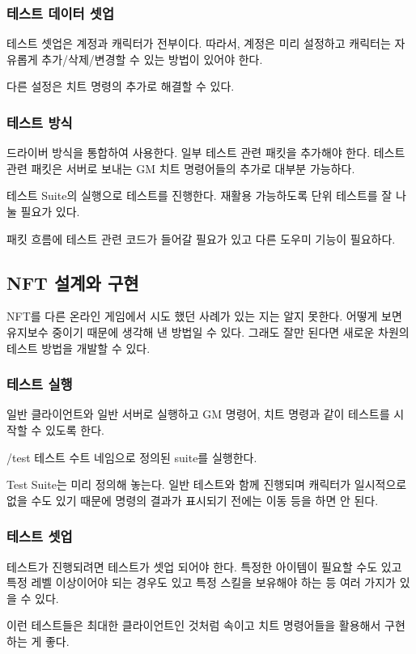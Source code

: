 \documentclass[chapter,kosection, 10.5pt, romanfixed, a4paper]{oblivoir}
\begin{document}
\subsubsection{테스트 데이터 셋업}
테스트 셋업은 계정과 캐릭터가 전부이다. 따라서, 계정은 미리 설정하고 
캐릭터는 자유롭게 추가/삭제/변경할 수 있는 방법이 있어야 한다. 

다른 설정은 치트 명령의 추가로 해결할 수 있다. 

\subsubsection{테스트 방식}
드라이버 방식을 통합하여 사용한다. 일부 테스트 관련 패킷을 추가해야 한다. 
테스트 관련 패킷은 서버로 보내는 GM 치트 명령어들의 추가로 대부분 가능하다. 

테스트 Suite의 실행으로 테스트를 진행한다. 재활용 가능하도록 단위 테스트를 잘 나눌 필요가 있다. 

패킷 흐름에 테스트 관련 코드가 들어갈 필요가 있고 다른 도우미 기능이 필요하다. 


\subsection{NFT 설계와 구현}
NFT를 다른 온라인 게임에서 시도 했던 사례가 있는 지는 알지 못한다. 
어떻게 보면 유지보수 중이기 때문에 생각해 낸 방법일 수 있다. 
그래도 잘만 된다면 새로운 차원의 테스트 방법을 개발할 수 있다. 

\subsubsection{테스트 실행}
일반 클라이언트와 일반 서버로 실행하고 GM 명령어, 치트 명령과 같이 테스트를 시작할 수 있도록 한다. 

/test 테스트 수트 네임으로 정의된 suite를 실행한다. 

Test Suite는 미리 정의해 놓는다. 
일반 테스트와 함께 진행되며 캐릭터가 일시적으로 없을 수도 있기 때문에 명령의 결과가 표시되기 전에는 이동 등을 하면 안 된다. 


\subsubsection{테스트 셋업}
테스트가 진행되려면 테스트가 셋업 되어야 한다. 특정한 아이템이 필요할 수도 있고 
특정 레벨 이상이어야 되는 경우도 있고 특정 스킬을 보유해야 하는 등 여러 가지가 있을 수 있다. 

이런 테스트들은 최대한 클라이언트인 것처럼 속이고 치트 명령어들을 활용해서 구현하는 게 좋다. 
\end{document}
